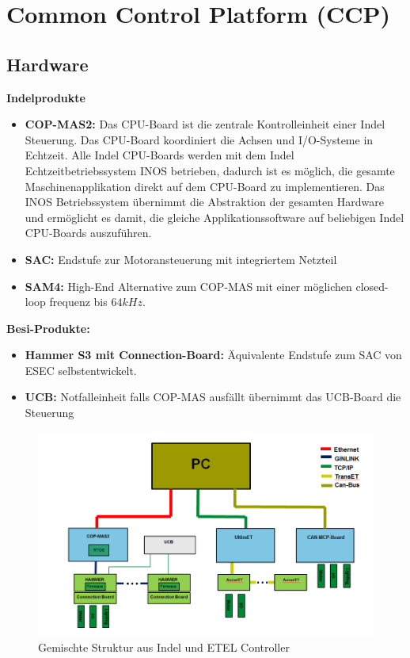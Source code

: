\section{Common Control Platform (CCP)}
	
	\subsection{Hardware}
		\textbf{Indelprodukte}
		\begin{itemize}
			\item \textbf{COP-MAS2:} Das CPU-Board ist die zentrale Kontrolleinheit einer Indel Steuerung. Das CPU-Board koordiniert die Achsen und I/O-Systeme in Echtzeit. Alle Indel CPU-Boards werden mit dem Indel Echtzeitbetriebssystem INOS betrieben, dadurch ist es möglich, die gesamte Maschinenapplikation direkt auf dem CPU-Board zu implementieren. Das INOS Betriebssystem übernimmt die Abstraktion der gesamten Hardware und ermöglicht es damit, die gleiche Applikationssoftware auf beliebigen Indel CPU-Boards auszuführen.
			\item \textbf{SAC:} Endstufe zur Motoransteuerung mit integriertem Netzteil
			\item \textbf{SAM4:} High-End Alternative zum COP-MAS mit einer möglichen closed-loop frequenz bis $ 64kHz $.
		\end{itemize}
		\textbf{Besi-Produkte:}
		\begin{itemize}
			\item \textbf{Hammer S3 mit Connection-Board:} Äquivalente Endstufe zum SAC von ESEC selbstentwickelt.
			\item \textbf{UCB: } Notfalleinheit falls COP-MAS ausfällt übernimmt das UCB-Board die Steuerung
		\end{itemize}
		\begin{figure}[!h]
			\centering
			\includegraphics[width=0.85\linewidth]{./pics/ccp/mixed_struktur.png}
			\caption{Gemischte Struktur aus Indel und ETEL Controller}
		\end{figure}
	
